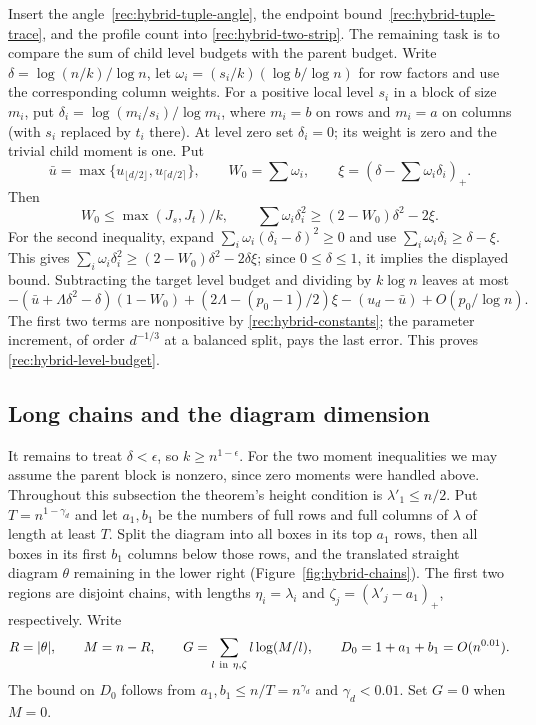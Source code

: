 Insert the angle~\eqref{rec:hybrid-tuple-angle}, the endpoint
bound~\eqref{rec:hybrid-tuple-trace}, and the profile count into
\eqref{rec:hybrid-two-strip}. The remaining task is to compare the
sum of child level budgets with the parent budget.
Write
$\delta=\log(n/k)/\log n$, let
$\omega_i=(s_i/k)(\log b/\log n)$ for row factors and use the
corresponding column weights. For a positive local level $s_i$ in a
block of size $m_i$, put
$\delta_i=\log(m_i/s_i)/\log m_i$, where $m_i=b$ on rows and
$m_i=a$ on columns (with $s_i$ replaced by $t_i$ there).
At level zero set $\delta_i=0$; its weight is zero and the trivial
child moment is one. Put
\[
 \bar u=\max\{u_{\lfloor d/2\rfloor},u_{\lceil d/2\rceil}\},
 \qquad W_0=\sum\omega_i,
 \qquad \xi=(\delta-\sum\omega_i\delta_i)_+.
\]
Then
\[
 W_0\le\max(J_s,J_t)/k,\qquad
 \sum\omega_i\delta_i^2\ge(2-W_0)\delta^2-2\xi.
\]
For the second inequality, expand
$\sum_i\omega_i(\delta_i-\delta)^2\ge0$ and use
$\sum_i\omega_i\delta_i\ge\delta-\xi$. This gives
$\sum_i\omega_i\delta_i^2\ge(2-W_0)\delta^2-2\delta\xi$;
since $0\le\delta\le1$, it implies the displayed bound.
Subtracting the target level budget and dividing by $k\log n$
leaves at most
\begin{equation}\label{rec:hybrid-level-close}
 -(\bar u+\Lambda\delta^2-\delta)(1-W_0)
 +(2\Lambda-(p_0-1)/2)\xi
 -(u_d-\bar u)+O(p_0/\log n).
\end{equation}
The first two terms are nonpositive by
\eqref{rec:hybrid-constants}; the parameter increment, of order
$d^{-1/3}$ at a balanced split, pays the last error.  This proves
\eqref{rec:hybrid-level-budget}.

\subsection{Long chains and the diagram dimension}

It remains to treat $\delta<\epsilon$, so $k\ge n^{1-\epsilon}$.
For the two moment inequalities we may assume the parent block is
nonzero, since zero moments were handled above.  Throughout this
subsection the theorem's height condition is $\lambda'_1\le n/2$.
Put $T=n^{1-\gamma_d}$ and let $a_1,b_1$
be the numbers of full rows and full columns of $\lambda$ of length
at least $T$. Split the diagram into all boxes in its top $a_1$
rows, then all boxes in its first $b_1$ columns below those rows,
and the translated straight diagram $\theta$ remaining in the
lower right (Figure~\ref{fig:hybrid-chains}). The first two regions are disjoint chains, with lengths
$\eta_i=\lambda_i$ and $\zeta_j=(\lambda'_j-a_1)_+$, respectively.
Write
\[
 R=|\theta|,\qquad M=n-R,\qquad
 G=\sum_{l\ {\rm in}\ \eta,\zeta}l\log(M/l),\qquad
 D_0=1+a_1+b_1=O(n^{0.01}).
\]
The bound on $D_0$ follows from $a_1,b_1\le n/T=n^{\gamma_d}$
and $\gamma_d<0.01$. Set $G=0$ when $M=0$.

